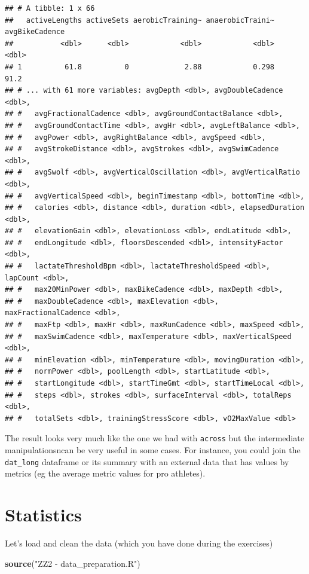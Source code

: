 \documentclass[
]{book}
\newenvironment{Shaded}{\begin{snugshade}}{\end{snugshade}}
\newcommand{\KeywordTok}[1]{\textcolor[rgb]{0.13,0.29,0.53}{\textbf{#1}}}
\newcommand{\NormalTok}[1]{#1}
\newcommand{\StringTok}[1]{\textcolor[rgb]{0.31,0.60,0.02}{#1}}
\begin{document}
\begin{verbatim}
## # A tibble: 1 x 66
##   activeLengths activeSets aerobicTraining~ anaerobicTraini~ avgBikeCadence
##           <dbl>      <dbl>            <dbl>            <dbl>          <dbl>
## 1          61.8          0             2.88            0.298           91.2
## # ... with 61 more variables: avgDepth <dbl>, avgDoubleCadence <dbl>,
## #   avgFractionalCadence <dbl>, avgGroundContactBalance <dbl>,
## #   avgGroundContactTime <dbl>, avgHr <dbl>, avgLeftBalance <dbl>,
## #   avgPower <dbl>, avgRightBalance <dbl>, avgSpeed <dbl>,
## #   avgStrokeDistance <dbl>, avgStrokes <dbl>, avgSwimCadence <dbl>,
## #   avgSwolf <dbl>, avgVerticalOscillation <dbl>, avgVerticalRatio <dbl>,
## #   avgVerticalSpeed <dbl>, beginTimestamp <dbl>, bottomTime <dbl>,
## #   calories <dbl>, distance <dbl>, duration <dbl>, elapsedDuration <dbl>,
## #   elevationGain <dbl>, elevationLoss <dbl>, endLatitude <dbl>,
## #   endLongitude <dbl>, floorsDescended <dbl>, intensityFactor <dbl>,
## #   lactateThresholdBpm <dbl>, lactateThresholdSpeed <dbl>, lapCount <dbl>,
## #   max20MinPower <dbl>, maxBikeCadence <dbl>, maxDepth <dbl>,
## #   maxDoubleCadence <dbl>, maxElevation <dbl>, maxFractionalCadence <dbl>,
## #   maxFtp <dbl>, maxHr <dbl>, maxRunCadence <dbl>, maxSpeed <dbl>,
## #   maxSwimCadence <dbl>, maxTemperature <dbl>, maxVerticalSpeed <dbl>,
## #   minElevation <dbl>, minTemperature <dbl>, movingDuration <dbl>,
## #   normPower <dbl>, poolLength <dbl>, startLatitude <dbl>,
## #   startLongitude <dbl>, startTimeGmt <dbl>, startTimeLocal <dbl>,
## #   steps <dbl>, strokes <dbl>, surfaceInterval <dbl>, totalReps <dbl>,
## #   totalSets <dbl>, trainingStressScore <dbl>, vO2MaxValue <dbl>
\end{verbatim}

The result looks very much like the one we had with \texttt{across} but the intermediate manipulationsncan be very useful in some cases. For instance, you could join the \texttt{dat\_long} dataframe or its summary with an external data that has values by metrics (eg the average metric values for pro athletes).

\hypertarget{stats}{%
\chapter{Statistics}\label{stats}}

Let's load and clean the data (which you have done during the exercises)

\begin{Shaded}
\begin{Highlighting}[]
\KeywordTok{source}\NormalTok{(}\StringTok{"ZZ2 - data_preparation.R"}\NormalTok{)}
\end{Highlighting}
\end{Shaded}
\end{document}
